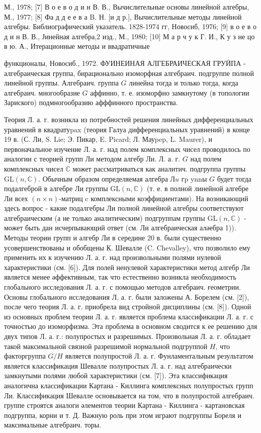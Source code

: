 \documentclass[10pt]{article}
\begin{document}
М., 1978; [7] В о е в о д и н В. В., Вычислительные основы линейной алгебры, М., 1977; [8] Фа д д е е в а B. Н. [и д р.], Вычислительные методы линейной алгебры. Библиографический указатель. 1828-1974 гг, Новосиб, 1976; [9] в о е в о д и н В. В., Јинейная алгебра,2 изд., М., 1980; [10] М а р ч у к Г. И., К у з не цо в ю. А., Итерационные методы и ввадратичные

функционалы, Новосиб., 1972. ФУИНЕИНАЯ АЛГЕБРАИЧЕСКАЯ ГРУӤПА - алгебраическая группа, бирационально изоморфная алгебраич. подгруппе полной линейной группы. Алгебраич. группа $G$ линейна тогда и только тогда, когда алгебраич. многообразие $G$ аффинно, т. е. изоморфно замкнутому (в топологии Зариского) подмногообразию афффинного пространства.



Теория Л. а. г. возникла из потребностей решения линейных дифференциальных уравнений в квадратуpax (теория Галуа дифференциальных уравнений) в конце 19 в. (С. Ли, S. Lie; Э. Пикар, E. Picard; Л. Мауpep, L. Maurer), и первоначальное изучение Л. а. г. над полем комплексных чисел проводилось по аналогии с теорией групп Ли методом алгебр Ли. Л. а. г. $G$ над полем комплексных чисел $\mathbb{C}$ может рассматриваться как аналитич. подгруппа группы $\mathrm{GL}(n, \mathbb{C})$. Обычным образом определяемая алгебра $Л u$ гp ynnы $G$ будет тогда подалгеброй в алгебре Ли группы $\mathrm{GL}(n, \mathbb{C})$ (т. е. в полной линейной алгебре Ли всех $(n \times n)$-матриц c комплексными коэффициентами). На возникающий здесь вопрос - какие подалгебры Ли полной линейной алгебры соответствуют алгебраическим (а не только аналитическим) подгруппам группы $\mathrm{GL}(n, \mathbb{C})$ - может быть дан исчерпывающий ответ (см. Ли алгебраическая аләебра 1)). Методы теории групп и алгебр Ли в середине 20 в. были существенно усовершенствованы и обобщены К. Шевалле (C. Chevalley), что позволило ему применить их к изучению Л. а. г. над произвольными полями нулевой характеристики (см. [6]). Для полей ненулевой характеристики метод алгебр Ли является менее әффективным, так что естественно возникла необходимость глобального исследования Л. а. г. с помощью методов алгебраич. ғеометрии. Основы глобального исследования Л. а. г. были заложены А. Борелем (см. [2]), после чего теория Л. а. г. приобрела вид стройной дисциплины (см. [8]). Одной из основных проблем теории Л. а. г. является проблема классификации Л. а. г. с точностью до изоморфизма. Эта проблема в основном сводится к ее решению для двух типов Л. а. г.: полупростых и разрешимых. Произвольная Л. а. г. обладает такой максимальной связной разрешимой нормальной подгруппой $H$, что факторгруппа $G / H$ является полупростой Л. а. г. Фунламентальным результатом является классификация Шевалле полупростых Л. а. г. над алгебраически замкнутыми полями любой характеристики (см. [7]). Эта классификация аналогична классификации Картана - Киллинга комплексных полупростых групп Ли. Классификация Шевалле основывается на том, что в полупростой алгебраич. группе строятся аналоги әлементов теории Картана - Киллинга - картановская подгруппа, корни и т. Д. Важную роль при этом играют подгруппы Бореля и максимальные алгебраич. торы.
\end{document}
